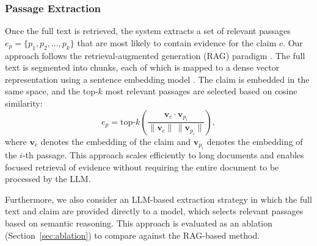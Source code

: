 \documentclass{article}
\theoremstyle{plain}
\theoremstyle{definition}
\theoremstyle{remark}
\begin{document}


\subsubsection{Passage Extraction}
\label{sec:passage_extraction}

Once the full text is retrieved, the system extracts a set of relevant passages $e_p = \{p_1, p_2, \ldots, p_k\}$ that are most likely to contain evidence for the claim $c$. Our approach follows the retrieval-augmented generation (RAG) paradigm \cite{lewis2020rag}. The full text is segmented into chunks, each of which is mapped to a dense vector representation using a sentence embedding model \cite{reimers2019sentence}. The claim is embedded in the same space, and the top-$k$ most relevant passages are selected based on cosine similarity:
\begin{equation}
e_p = \text{top-}k \left( \frac{\mathbf{v}_c \cdot \mathbf{v}_{p_i}}{\|\mathbf{v}_c\| \, \|\mathbf{v}_{p_i}\|} \right),
\end{equation}
where $\mathbf{v}_c$ denotes the embedding of the claim and $\mathbf{v}_{p_i}$ denotes the embedding of the $i$-th passage. This approach scales efficiently to long documents and enables focused retrieval of evidence without requiring the entire document to be processed by the LLM.


Furthermore, we also consider an LLM-based extraction strategy in which the full text and claim are provided directly to a model, which selects relevant passages based on semantic reasoning. This approach is evaluated as an ablation (Section~\ref{sec:ablation}) to compare against the RAG-based method.
\end{document}
